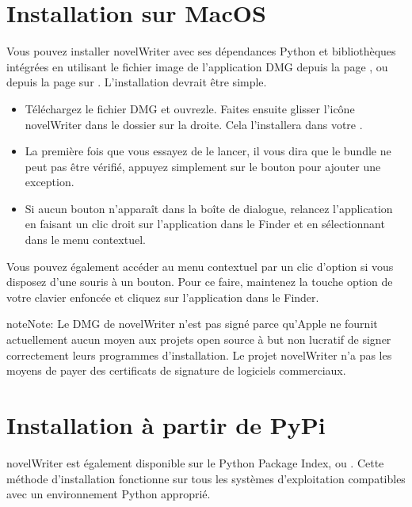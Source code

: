 \documentclass[a4paper,11pt,french]{sphinxmanual}
\begin{document}
\section{Installation sur MacOS}
\label{\detokenize{int_started:installing-on-macos}}\label{\detokenize{int_started:a-started-macos}}
\sphinxAtStartPar
Vous pouvez installer novelWriter avec ses dépendances Python et bibliothèques intégrées en utilisant le fichier image de l’application DMG depuis la page , ou depuis la page  sur . L’installation devrait être simple.
\begin{itemize}
\item {} 
\sphinxAtStartPar
Téléchargez le fichier DMG et ouvrez\sphinxhyphen{}le. Faites ensuite glisser l’icône novelWriter dans le dossier  sur la droite. Cela l’installera dans votre .

\item {} 
\sphinxAtStartPar
La première fois que vous essayez de le lancer, il vous dira que le bundle ne peut pas être vérifié, appuyez simplement sur le bouton  pour ajouter une exception.

\item {} 
\sphinxAtStartPar
Si aucun bouton  n’apparaît dans la boîte de dialogue, relancez l’application en faisant un clic droit sur l’application dans le Finder et en sélectionnant  dans le menu contextuel.

\end{itemize}

\sphinxAtStartPar
Vous pouvez également accéder au menu contextuel par un clic d’option si vous disposez d’une souris à un bouton. Pour ce faire, maintenez la touche option de votre clavier enfoncée et cliquez sur l’application dans le Finder.

\begin{sphinxadmonition}{note}{Note:}
\sphinxAtStartPar
Le DMG de novelWriter n’est pas signé parce qu’Apple ne fournit actuellement aucun moyen aux projets open source à but non lucratif de signer correctement leurs programmes d’installation. Le projet novelWriter n’a pas les moyens de payer des certificats de signature de logiciels commerciaux.
\end{sphinxadmonition}


\section{Installation à partir de PyPi}
\label{\detokenize{int_started:installing-from-pypi}}\label{\detokenize{int_started:a-started-pip}}
\sphinxAtStartPar
novelWriter est également disponible sur le Python Package Index, ou . Cette méthode d’installation fonctionne sur tous les systèmes d’exploitation compatibles avec un environnement Python approprié.
\end{document}

